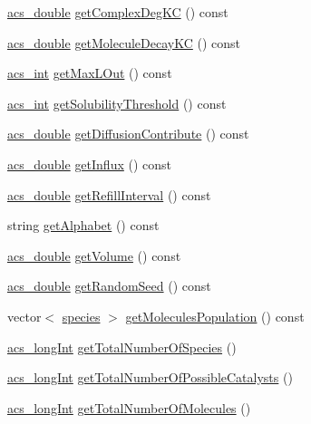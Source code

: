 \begin{DoxyCompactItemize}
\item 
\hyperlink{a00050_ab776853a005fcbf56af0424a2a4dd607}{acs\+\_\+double} \hyperlink{a00013_ae58bcd60ae01a8ba12f83c1328121c35}{get\+Complex\+Deg\+K\+C} () const 
\item 
\hyperlink{a00050_ab776853a005fcbf56af0424a2a4dd607}{acs\+\_\+double} \hyperlink{a00013_a4ed6ad35297e718398fb42a2b9dbe4ae}{get\+Molecule\+Decay\+K\+C} () const 
\item 
\hyperlink{a00050_a8d277355641a098190360234e2ebde35}{acs\+\_\+int} \hyperlink{a00013_a4c58b3ce555f04f009bcfb7bbc2b0000}{get\+Max\+L\+Out} () const 
\item 
\hyperlink{a00050_a8d277355641a098190360234e2ebde35}{acs\+\_\+int} \hyperlink{a00013_a6df38337d38f2f714be7058a2a31202c}{get\+Solubility\+Threshold} () const 
\item 
\hyperlink{a00050_ab776853a005fcbf56af0424a2a4dd607}{acs\+\_\+double} \hyperlink{a00013_a46193e153bd5dcc37fb35346cb7fd971}{get\+Diffusion\+Contribute} () const 
\item 
\hyperlink{a00050_ab776853a005fcbf56af0424a2a4dd607}{acs\+\_\+double} \hyperlink{a00013_a6f0b4481779cd12dbcd8155916c7d703}{get\+Influx} () const 
\item 
\hyperlink{a00050_ab776853a005fcbf56af0424a2a4dd607}{acs\+\_\+double} \hyperlink{a00013_a469a7ce80a1e9e5fae77b46b66dfee18}{get\+Refill\+Interval} () const 
\item 
string \hyperlink{a00013_add8478cfc878c3aa5a57b2a71357a088}{get\+Alphabet} () const 
\item 
\hyperlink{a00050_ab776853a005fcbf56af0424a2a4dd607}{acs\+\_\+double} \hyperlink{a00013_a355b53cbc86aaab2a6d114980162ac0e}{get\+Volume} () const 
\item 
\hyperlink{a00050_ab776853a005fcbf56af0424a2a4dd607}{acs\+\_\+double} \hyperlink{a00013_ab6952f7f6fd971ece0a8661733cfc2b3}{get\+Random\+Seed} () const 
\item 
vector$<$ \hyperlink{a00021}{species} $>$ \hyperlink{a00013_adb12eb52af74ea1fdfe0cd195109fe83}{get\+Molecules\+Population} () const 
\item 
\hyperlink{a00050_a19319d75f02db4308bc5c0026d98cd85}{acs\+\_\+long\+Int} \hyperlink{a00013_a7a321296874fa1320da225cdbbf56a64}{get\+Total\+Number\+Of\+Species} ()
\item 
\hyperlink{a00050_a19319d75f02db4308bc5c0026d98cd85}{acs\+\_\+long\+Int} \hyperlink{a00013_a8796aead7bcc4a3f91eec7bc908dfa5b}{get\+Total\+Number\+Of\+Possible\+Catalysts} ()
\item 
\hyperlink{a00050_a19319d75f02db4308bc5c0026d98cd85}{acs\+\_\+long\+Int} \hyperlink{a00013_a57e7ac49955f4717096cb6696ee03a61}{get\+Total\+Number\+Of\+Molecules} ()

\end{DoxyCompactItemize}
